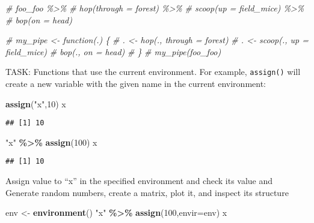 \documentclass[
]{article}
\newenvironment{Shaded}{\begin{snugshade}}{\end{snugshade}}
\newcommand{\AttributeTok}[1]{\textcolor[rgb]{0.13,0.29,0.53}{#1}}
\newcommand{\CommentTok}[1]{\textcolor[rgb]{0.56,0.35,0.01}{\textit{#1}}}
\newcommand{\DecValTok}[1]{\textcolor[rgb]{0.00,0.00,0.81}{#1}}
\newcommand{\FunctionTok}[1]{\textcolor[rgb]{0.13,0.29,0.53}{\textbf{#1}}}
\newcommand{\NormalTok}[1]{#1}
\newcommand{\OtherTok}[1]{\textcolor[rgb]{0.56,0.35,0.01}{#1}}
\newcommand{\SpecialCharTok}[1]{\textcolor[rgb]{0.81,0.36,0.00}{\textbf{#1}}}
\newcommand{\StringTok}[1]{\textcolor[rgb]{0.31,0.60,0.02}{#1}}
\begin{document}
\begin{Shaded}
\begin{Highlighting}[]
\CommentTok{\# foo\_foo \%\textgreater{}\%}
\CommentTok{\#   hop(through = forest) \%\textgreater{}\%}
\CommentTok{\#   scoop(up = field\_mice) \%\textgreater{}\%}
\CommentTok{\#   bop(on = head)}
\end{Highlighting}
\end{Shaded}

\begin{Shaded}
\begin{Highlighting}[]
\CommentTok{\# my\_pipe \textless{}{-} function(.) \{}
\CommentTok{\#   . \textless{}{-} hop(., through = forest)}
\CommentTok{\#   . \textless{}{-} scoop(., up = field\_mice)}
\CommentTok{\#   bop(., on = head)}
\CommentTok{\# \}}
\CommentTok{\# my\_pipe(foo\_foo)}
\end{Highlighting}
\end{Shaded}

TASK: Functions that use the current environment. For example,
\texttt{assign()} will create a new variable with the given name in the
current environment:

\begin{Shaded}
\begin{Highlighting}[]
\FunctionTok{assign}\NormalTok{(}\StringTok{"x"}\NormalTok{,}\DecValTok{10}\NormalTok{)}
\NormalTok{x}
\end{Highlighting}
\end{Shaded}

\begin{verbatim}
## [1] 10
\end{verbatim}

\begin{Shaded}
\begin{Highlighting}[]
\StringTok{"x"} \SpecialCharTok{\%\textgreater{}\%} \FunctionTok{assign}\NormalTok{(}\DecValTok{100}\NormalTok{)}
\NormalTok{x}
\end{Highlighting}
\end{Shaded}

\begin{verbatim}
## [1] 10
\end{verbatim}

Assign value to ``x'' in the specified environment and check its value
and Generate random numbers, create a matrix, plot it, and inspect its
structure

\begin{Shaded}
\begin{Highlighting}[]
\NormalTok{env }\OtherTok{\textless{}{-}} \FunctionTok{environment}\NormalTok{()}
\StringTok{"x"} \SpecialCharTok{\%\textgreater{}\%} \FunctionTok{assign}\NormalTok{(}\DecValTok{100}\NormalTok{,}\AttributeTok{envir=}\NormalTok{env)}
\NormalTok{x}
\end{Highlighting}
\end{Shaded}
\end{document}
